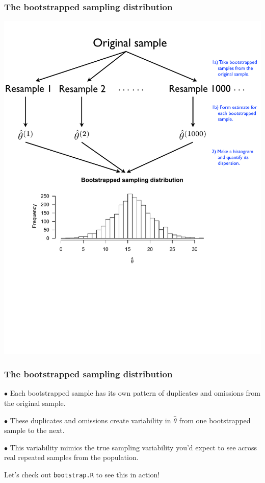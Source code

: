 \documentclass{beamer}
\newcommand{\bo}[1]{\textcolor{burntorange}{#1}}
\newcommand{\sk}{\vspace{.5cm}}
\begin{document}
\begin{frame}
	\frametitle{The bootstrapped sampling distribution}
	\begin{center}
	\includegraphics[scale=0.42]{figures/bootstrapping_schematic}		
	\end{center}
\end{frame}

\begin{frame}
	\frametitle{The bootstrapped sampling distribution}
\bo{$\bullet$} Each bootstrapped sample has its own pattern of duplicates and omissions from the original sample. \\ \sk\sk

\bo{$\bullet$} These duplicates and omissions create variability in $\hat{\theta}$ from one bootstrapped sample to the next. \\ \sk\sk

\bo{$\bullet$} This variability mimics the true sampling variability you'd expect to see across real repeated samples from the population. \\ \sk\sk

Let's check out {\tt bootstrap.R} to see this in action!

\end{frame}
\end{document}
